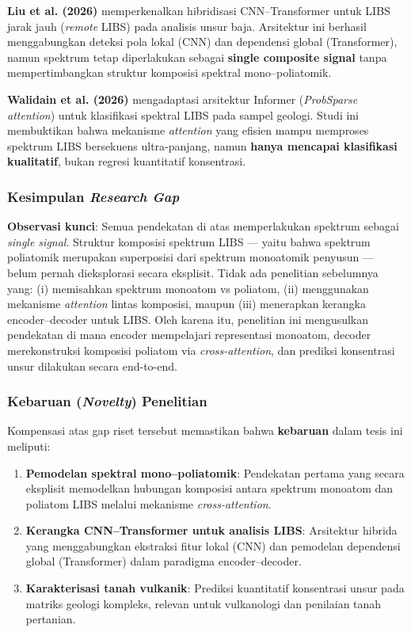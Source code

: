\documentclass[12pt, a4paper]{article}
\begin{document}
\textbf{Liu et al. (2026)} \citep{liu2026} memperkenalkan hibridisasi CNN–Transformer untuk LIBS jarak jauh (\textit{remote} LIBS) pada analisis unsur baja. Arsitektur ini berhasil menggabungkan deteksi pola lokal (CNN) dan dependensi global (Transformer), namun spektrum tetap diperlakukan sebagai \textbf{single composite signal} tanpa mempertimbangkan struktur komposisi spektral mono–poliatomik.

\textbf{Walidain et al. (2026)} \citep{walidain2026} mengadaptasi arsitektur Informer (\textit{ProbSparse attention}) untuk klasifikasi spektral LIBS pada sampel geologi. Studi ini membuktikan bahwa mekanisme \textit{attention} yang efisien mampu memproses spektrum LIBS bersekuens ultra-panjang, namun \textbf{hanya mencapai klasifikasi kualitatif}, bukan regresi kuantitatif konsentrasi.

\subsubsection{Kesimpulan \textit{Research Gap}}
\textbf{Observasi kunci}: Semua pendekatan di atas memperlakukan spektrum sebagai \textit{single signal}. Struktur komposisi spektrum LIBS — yaitu bahwa spektrum poliatomik merupakan superposisi dari spektrum monoatomik penyusun — belum pernah dieksplorasi secara eksplisit. Tidak ada penelitian sebelumnya yang: (i) memisahkan spektrum monoatom vs poliatom, (ii) menggunakan mekanisme \textit{attention} lintas komposisi, maupun (iii) menerapkan kerangka encoder–decoder untuk LIBS. Oleh karena itu, penelitian ini mengusulkan pendekatan di mana encoder mempelajari representasi monoatom, decoder merekonstruksi komposisi poliatom via \textit{cross-attention}, dan prediksi konsentrasi unsur dilakukan secara end-to-end.

\subsubsection{Kebaruan (\textit{Novelty}) Penelitian}
Kompensasi atas gap riset tersebut memastikan bahwa \textbf{kebaruan} dalam tesis ini meliputi:
\begin{enumerate}[label=\arabic*.]
    \item \textbf{Pemodelan spektral mono–poliatomik}: Pendekatan pertama yang secara eksplisit memodelkan hubungan komposisi antara spektrum monoatom dan poliatom LIBS melalui mekanisme \textit{cross-attention}.
    \item \textbf{Kerangka CNN–Transformer untuk analisis LIBS}: Arsitektur hibrida yang menggabungkan ekstraksi fitur lokal (CNN) dan pemodelan dependensi global (Transformer) dalam paradigma encoder–decoder.
    \item \textbf{Karakterisasi tanah vulkanik}: Prediksi kuantitatif konsentrasi unsur pada matriks geologi kompleks, relevan untuk vulkanologi dan penilaian tanah pertanian.
\end{enumerate}
\end{document}
